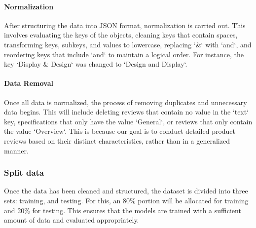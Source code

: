 \paragraph{Normalization}
After structuring the data into JSON format, normalization is carried out. This involves evaluating the keys of the objects, cleaning keys that contain spaces, transforming keys, subkeys, and values to lowercase, replacing `\&` with `and`, and reordering keys that include `and` to maintain a logical order. For instance, the key `Display \& Design` was changed to `Design and Display`.

\paragraph{Data Removal}
Once all data is normalized, the process of removing duplicates and unnecessary data begins. This will include deleting reviews that contain no value in the `text` key, specifications that only have the value `General`, or reviews that only contain the value `Overview`. This is because our goal is to conduct detailed product reviews based on their distinct characteristics, rather than in a generalized manner.

\subsubsection{Split data}
Once the data has been cleaned and structured, the dataset is divided into three sets: training, and testing. For this, an 80\% portion will be allocated for training and 20\% for testing. This ensures that the models are trained with a sufficient amount of data and evaluated appropriately.

